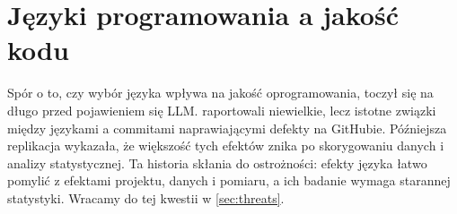 \section{Języki programowania a jakość kodu}
\label{sec:related-quality}

Spór o to, czy wybór języka wpływa na jakość oprogramowania, toczył się na długo przed pojawieniem
się LLM. \citet{ray2014largescale} raportowali niewielkie, lecz istotne związki między językami
a commitami naprawiającymi defekty na GitHubie. Późniejsza replikacja \citet{berger2019impact}
wykazała, że większość tych efektów znika po skorygowaniu danych i analizy statystycznej. Ta historia
skłania do ostrożności: efekty języka łatwo pomylić z efektami projektu, danych i pomiaru, a ich
badanie wymaga starannej statystyki. Wracamy do tej kwestii w \cref{sec:threats}.
